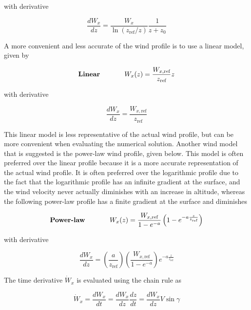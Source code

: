 \documentclass[11pt,letterpaper,onecolumn]{article}
\begin{document}
  with derivative

  \begin{equation*}
    \frac{dW_{x}}{dz}=\frac{W_{x}}{\ln(z_{\text{ref}}/z)}\frac{1}{z+z_{0}}
  \end{equation*}

  A more convenient and less accurate of the wind profile is to use a linear model, given by

  \begin{equation*}
    \mbox{\textbf{Linear}}
    \hspace{0.5in}
    W_{x}(z)=\frac{W_{x,\text{ref}}}{z_{\text{ref}}}z
  \end{equation*}

  with derivative

  \begin{equation*}
    \frac{dW_{x}}{dz}=\frac{W_{x,\text{ref}}}{z_{\text{ref}}}
  \end{equation*}

  This linear model is less representative of the actual wind profile, but can be more convenient when evaluating the numerical solution.
  Another wind model that is suggested is the power-law wind profile,\cite{barnes.howflies.2004} given below.
  This model is often preferred over the linear profile because it is a more accurate representation of the actual wind profile.
  It is often preferred over the logarithmic profile due to the fact that the logarithmic profile has an infinite gradient at the surface, and the wind velocity never actually diminishes with an increase in altitude, whereas the following power-law profile has a finite gradient at the surface and diminishes

  \begin{equation*}
    \mbox{\textbf{Power-law}}
    \hspace{0.5in}
    W_{x}(z)=\frac{W_{x,\text{ref}}}{1-e^{-a}}\left(1-e^{-a\frac{z}{z_{\text{ref}}}}\right)
  \end{equation*}

  with derivative

  \begin{equation*}
    \frac{dW_{x}}{dz}=\left(\frac{a}{z_{\text{ref}}}\right)\left(\frac{W_{x,\text{ref}}}{1-e^{-a}}\right)e^{-a\frac{z}{z_{\text{ref}}}}
  \end{equation*}

  The time derivative $\dot{W}_{x}$ is evaluated using the chain rule as

  \begin{equation*}
    \dot{W}_{x}=\frac{dW_{x}}{dt}=\frac{dW_{x}}{dz}\frac{dz}{dt}=\frac{dW_{x}}{dz}V\sin\gamma
  \end{equation*}
\end{document}
